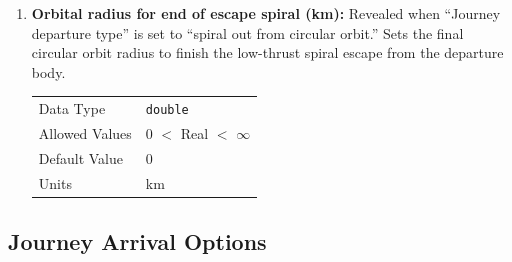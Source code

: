 \begin{enumerate}
    \item \textbf{Orbital radius for end of escape spiral (km):} Revealed when ``Journey departure type'' is set to ``spiral out from circular orbit.'' Sets the final circular orbit radius to finish the low-thrust spiral escape from the departure body.
        
        \begin{table}[H]
            \hspace{2cm}
            \begin{tabular}{ll}
            Data Type & \verb|double| \\
            Allowed Values & 0 $<$ Real $<$ $\infty$ \\
            Default Value & 0 \\
            Units & km 
            \end{tabular}
        \end{table}

    \end{enumerate}


\subsection{Journey Arrival Options}

